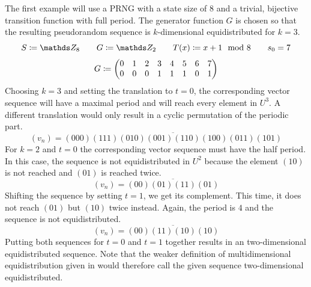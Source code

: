 \documentclass{stdlocal}
\begin{document}
    \noindent
    The first example will use a PRNG with a state size of $8$ and a trivial, bijective transition function with full period.
    The generator function $G$ is chosen so that the resulting pseudorandom sequence is $k$-dimensional equidistributed for $k=3$.
    \[
      S \define \setInteger_{8}
      \separate
      G \define \setInteger_2
      \separate
      T(x) \define x + 1 \mod 8
      \separate
      s_0 = 7
    \]
    \[
      \setcounter{MaxMatrixCols}{20}
      G \define
      \begin{pmatrix}
        0 & 1 & 2 & 3 & 4 & 5 & 6 & 7 \\
        0 & 0 & 0 & 1 & 1 & 1 & 0 & 1
      \end{pmatrix}
    \]
    Choosing $k=3$ and setting the translation to $t=0$, the corresponding vector sequence will have a maximal period and will reach every element in $U^3$.
    A different translation would only result in a cyclic permutation of the periodic part.
    \[
      (v_n) = \overline{(000)(111)(010)(001)(110)(100)(011)(101)}
    \]
    For $k=2$ and $t=0$ the corresponding vector sequence must have the half period.
    In this case, the sequence is not equidistributed in $U^2$ because the element $(10)$ is not reached and $(01)$ is reached twice.
    \[
      (v_n) = \overline{(00)(01)(11)(01)}
    \]
    Shifting the sequence by setting $t=1$, we get its complement.
    This time, it does not reach $(01)$ but $(10)$ twice instead.
    Again, the period is $4$ and the sequence is not equidistributed.
    \[
      (v_n) = \overline{(00)(11)(10)(10)}
    \]
    Putting both sequences for $t=0$ and $t=1$ together results in an two-dimensional equidistributed sequence.
    Note that the weaker definition of multidimensional equidistribution given in \textcite{lecuyer1994} would therefore call the given sequence two-dimensional equidistributed.
\end{document}
